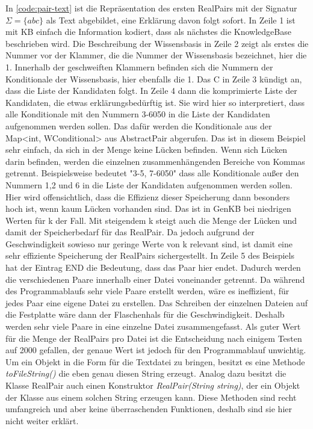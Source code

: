 \documentclass[12pt,a4paper]{article}
\begin{document}
In \autoref{code:pair-text} ist die Repräsentation des ersten RealPairs mit der Signatur $\Sigma=\{abc\}$  als Text abgebildet, eine Erklärung davon folgt sofort. In Zeile 1 ist mit KB einfach die Information kodiert, dass als nächstes die KnowledgeBase beschrieben wird. Die Beschreibung der Wissensbasis in Zeile 2 zeigt als erstes die Nummer vor der Klammer, die die Nummer der Wissensbasis bezeichnet, hier die 1. Innerhalb der geschweiften Klammern befinden sich die Nummern der Konditionale der Wissensbasis, hier ebenfalls die 1. Das C in Zeile 3 kündigt an, dass die Liste der Kandidaten folgt. In Zeile 4 dann die komprimierte Liste der Kandidaten, die etwas erklärungsbedürftig ist. Sie wird hier so interpretiert, dass alle Konditionale mit den Nummern 3-6050 in die Liste der Kandidaten aufgenommen werden sollen. Das dafür werden die Konditionale aus der Map<int, WConditional> aus AbstractPair abgerufen. Das ist in diesem Beispiel sehr einfach, da sich in der Menge keine Lücken befinden. Wenn sich Lücken darin befinden, werden die einzelnen zusammenhängenden Bereiche von Kommas getrennt. Beispielsweise bedeutet "3-5, 7-6050" dass alle Konditionale außer den Nummern 1,2 und 6 in die Liste der Kandidaten aufgenommen werden sollen. Hier wird offensichtlich, dass die Effizienz dieser Speicherung dann besonders hoch ist, wenn kaum Lücken vorhanden sind. Das ist in GenKB bei niedrigen Werten für k der Fall. Mit steigendem k steigt auch die Menge der Lücken und damit der Speicherbedarf für das RealPair. Da jedoch aufgrund der Geschwindigkeit sowieso nur geringe Werte von k relevant sind, ist damit eine sehr effiziente Speicherung der RealPairs sichergestellt. In Zeile 5 des Beispiels hat der Eintrag END die Bedeutung, dass das Paar hier endet. Dadurch werden die verschiedenen Paare innerhalb einer Datei voneinander getrennt. Da während des Programmablaufs sehr viele Paare erstellt werden, wäre es ineffizient, für jedes Paar eine eigene Datei zu erstellen. Das Schreiben der einzelnen Dateien auf die Festplatte wäre dann der Flaschenhals für die Geschwindigkeit. Deshalb werden sehr viele Paare in eine einzelne Datei zusammengefasst. Als guter Wert für die Menge der RealPairs pro Datei ist die Entscheidung nach einigem Testen auf 2000 gefallen, der genaue Wert ist jedoch für den Programmablauf unwichtig. \\
Um ein Objekt in die Form für die Textdatei zu bringen, besitzt es eine Methode \textit{toFileString()} die eben genau diesen String erzeugt. Analog dazu besitzt die Klasse RealPair auch einen Konstruktor \textit{RealPair(String string)}, der ein Objekt der Klasse aus einem solchen String erzeugen kann. Diese Methoden sind recht umfangreich und aber keine überraschenden Funktionen, deshalb sind sie hier nicht weiter erklärt.
\end{document}
